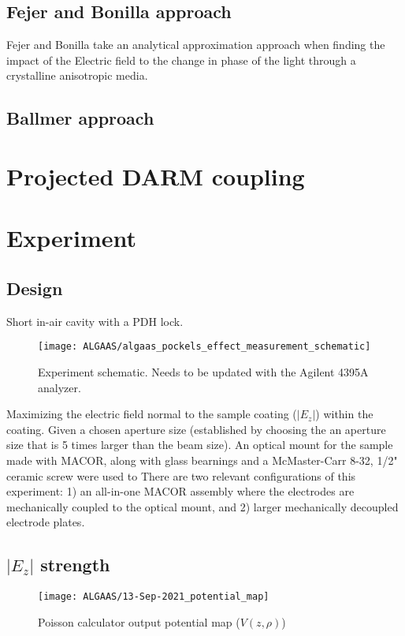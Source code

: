 \subsection{Fejer and Bonilla approach}
Fejer and Bonilla take an analytical approximation approach when finding the impact of the Electric field to the change in phase of the light through a crystalline anisotropic media.

\subsection{Ballmer approach}



\section{Projected DARM coupling}

\section{Experiment}

\subsection{Design}
Short in-air cavity with a PDH lock.

\begin{figure}[H]
\texttt{[image: ALGAAS/algaas\_pockels\_effect\_measurement\_schematic]}
\caption{Experiment schematic. Needs to be updated with the Agilent 4395A analyzer.}
\label{fig:poisson_output}
\end{figure}

Maximizing the electric field normal to the sample coating ($|E_z|$) within the coating. Given a chosen aperture size (established by choosing the an aperture size that is 5 times larger than the beam size). An optical mount for the sample made with MACOR, along with glass bearnings and a McMaster-Carr 8-32, 1/2" ceramic screw were used to There are two relevant configurations of this experiment: 1) an all-in-one MACOR assembly where the electrodes are mechanically coupled to the optical mount, and 2) larger mechanically decoupled electrode plates.



\subsection{$|E_z|$ strength}
\begin{figure}[H]
\texttt{[image: ALGAAS/13-Sep-2021\_potential\_map]}
\caption{Poisson calculator output potential map ($V(z,\rho)$)}
\label{fig:poisson_calc_output}
\end{figure}

